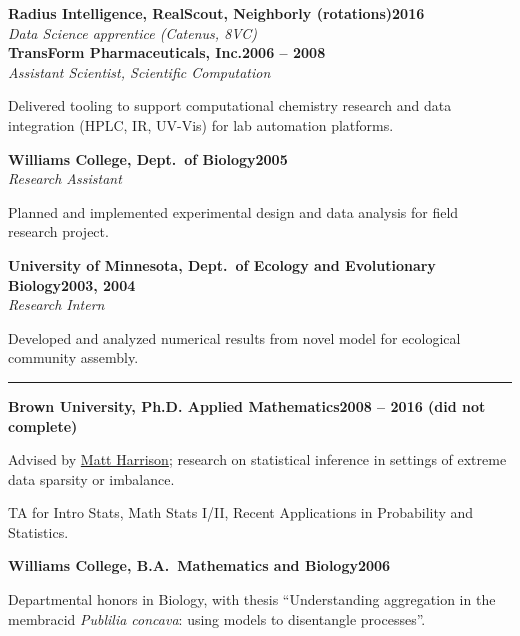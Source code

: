 \documentclass{article}
\newcommand{\ressection}[1]{\noindent{\large\textbf{#1}}\vspace{2pt}\hrule\vspace{4pt}}
\newcommand{\leftandright}[2]{\noindent\textbf{#1}\hfill\textbf{#2}}
\begin{document}
\leftandright{Radius Intelligence, RealScout, Neighborly (rotations)}{2016} \\
\textit{Data Science apprentice (Catenus, 8VC)} \\

\leftandright{TransForm Pharmaceuticals, Inc.}{2006 -- 2008} \\
\textit{Assistant Scientist, Scientific Computation}

\begin{itemize*}
\item Delivered tooling to support computational chemistry research
  and data integration (HPLC, IR, UV-Vis) for lab automation
  platforms.
\end{itemize*}

\leftandright{Williams College, Dept.\ of Biology}{2005} \\
\textit{Research Assistant}

\begin{itemize*}
\item Planned and implemented experimental design and data analysis
  for field research project.
\end{itemize*}

\leftandright{University of Minnesota, Dept.\ of Ecology and
  Evolutionary Biology}{2003, 2004} \\
\textit{Research Intern}

\begin{itemize*}
\item Developed and analyzed numerical results from novel model for ecological
  community assembly.
\end{itemize*}

\ressection{Education}

\leftandright{Brown University, \textmd{Ph.D. Applied
    Mathematics}}{2008 -- 2016 (did not complete)}
\begin{itemize*}
\item Advised by \href{http://www.dam.brown.edu/people/harrison}{Matt
  Harrison}; research on statistical inference in settings of extreme
  data sparsity or imbalance.
\item TA for Intro Stats, Math Stats I/II, Recent Applications in
  Probability and Statistics.
\end{itemize*}

\leftandright{Williams College, \textmd{B.A.\ Mathematics and
    Biology}}{2006}
\begin{itemize*}
\item Departmental honors in Biology, with thesis ``Understanding
  aggregation in the membracid \emph{Publilia concava}: using models
  to disentangle processes''.
\end{itemize*}
\end{document}
